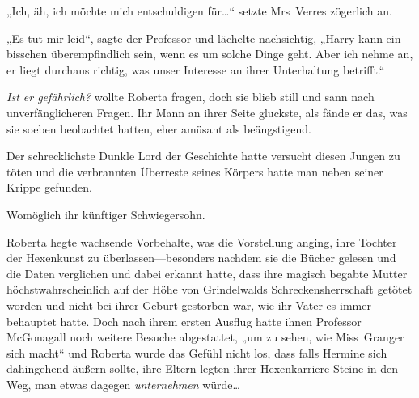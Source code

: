 „Ich, äh, ich möchte mich entschuldigen für…“ setzte Mrs~Verres zögerlich an.

„Es tut mir leid“, sagte der Professor und lächelte nachsichtig,
„Harry kann ein bisschen überempfindlich sein, wenn es um solche Dinge geht. Aber ich nehme an, er liegt durchaus richtig, was unser Interesse an ihrer Unterhaltung betrifft.“

\emph{Ist er gefährlich?} wollte Roberta fragen, doch sie blieb still und sann nach unverfänglicheren Fragen. Ihr Mann an ihrer Seite gluckste, als fände er das, was sie soeben beobachtet hatten, eher amüsant als beängstigend.

Der schrecklichste Dunkle Lord der Geschichte hatte versucht diesen Jungen zu töten und die verbrannten Überreste seines Körpers hatte man neben seiner Krippe gefunden.

Womöglich ihr künftiger Schwiegersohn.

Roberta hegte wachsende Vorbehalte, was die Vorstellung anging, ihre Tochter der Hexenkunst zu überlassen—besonders nachdem sie die Bücher gelesen und die Daten verglichen und dabei erkannt hatte, dass ihre magisch begabte Mutter höchstwahrscheinlich auf der Höhe von Grindelwalds Schreckensherrschaft getötet worden und nicht bei ihrer Geburt gestorben war, wie ihr Vater es immer behauptet hatte. Doch nach ihrem ersten Ausflug hatte ihnen Professor McGonagall noch weitere Besuche abgestattet, „um zu sehen, wie Miss~Granger sich macht“ und Roberta wurde das Gefühl nicht los, dass falls Hermine sich dahingehend äußern sollte, ihre Eltern legten ihrer Hexenkarriere Steine in den Weg, man etwas dagegen \emph{unternehmen} würde…

